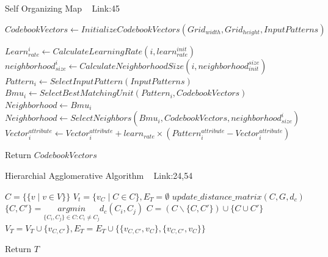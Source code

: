 \documentclass[a4paper]{article}
\begin{document}
  \begin{algorithm}
   \caption{Self Organizing Map ~\cite{som3} Link:45 }
    \begin{algorithmic}[1]
     \State $CodebookVectors \leftarrow InitializeCodebookVectors(Grid_{width},Grid_{height},InputPatterns) $
     
    
            \State $Learn_{rate}^i \leftarrow CalculateLearningRate(i,learn_{rate}^{init})$
            \State $neighborhood_{size}^i \leftarrow CalculateNeighborhoodSize(i,neighborhood_{init}^{size})$
            \State $Pattern_i \leftarrow SelectInputPattern(InputPatterns)$
             \State $Bmu_i \leftarrow SelectBestMatchingUnit(Pattern_i,CodebookVectors)$
             \State $Neighborhood \leftarrow Bmu_i$
              \State $Neighborhood \leftarrow  SelectNeighbors(Bmu_i,CodebookVectors,neighborhood_{size}^i)$
            \State $Vector_i^{attribute} \leftarrow Vector_i^{attribute} + learn_{rate} \times (Pattern_i ^{attribute} - Vector_i ^{attribute})  $
            \EndFor
          
            
            \EndFor
           
        \EndFor
        
       
       \State Return $CodebookVectors$



 

\end{algorithmic}
\end{algorithm}


  \begin{algorithm}
   \caption{Hierarchial Agglomerative Algorithm ~\cite{haa1} Link:24,54}
    \begin{algorithmic}[1]
     \State $C = \{\{v\mid v \in V\}\} $ 
     \State $V_t = \{v_C\mid C \in C\},E_T = \emptyset$ 
     \State $update\_distance\_matrix(C,G,d_c)$
     \State $\{C,C'\} =  \underset{\{C_i,C_j\} \in C : C_i \neq C_j}{argmin} d_c (C_i,C_j)$
     \State $C = (C \backslash \{C,C'\}) \cup \{C \cup C'\}$ 
     \State $V_T = V_T \cup \{v_{C,C'}\},E_T = E_T \cup \{\{v_{C,C'} ,v_{C}\},\{v_{C,C'} ,v_{C}\}\}$ 
     \EndWhile
    
      
        
       
       \State Return $T$



 

\end{algorithmic}
\end{algorithm}
\end{document}
